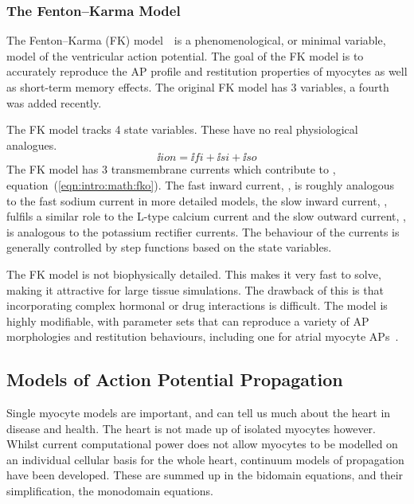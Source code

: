 \subsubsection{The Fenton--Karma Model}

The Fenton--Karma (FK) model~\cite{Fenton1998,Bueno-Orovio2008}\ is a
phenomenological, or minimal variable, model of the ventricular action
potential.
The goal of the FK model is to accurately reproduce the AP profile and
restitution properties of myocytes as well as short-term memory effects.
The original FK model has 3 variables, a fourth was added recently.

The FK model tracks 4 state variables.
These have no real physiological analogues.
\begin{equation}
\label{eqn:intro:math:fko}
\ii{ion} = \ii{fi} + \ii{si} + \ii{so}
\end{equation}
The FK model has 3 transmembrane currents which contribute to ,
equation~(\ref{eqn:intro:math:fko}).
The fast inward current, , is roughly analogous to the fast sodium
current in more detailed models, the slow inward current, , fulfils a
similar role to the L-type calcium current and the slow outward current, ,
is analogous to the potassium rectifier currents.
The behaviour of the currents is generally controlled by step functions based
on the state variables.

The FK model is not biophysically detailed.
This makes it very fast to solve, making it attractive for large tissue
simulations.
The drawback of this is that incorporating complex hormonal or drug interactions
is difficult.
The model is highly modifiable, with parameter sets that can reproduce a variety
of AP morphologies and restitution behaviours, including one for atrial myocyte
APs~\cite{Weber2008}.

\subsection{Models of Action Potential Propagation}

Single myocyte models are important, and can tell us much about the heart in
disease and health.
The heart is not made up of isolated myocytes however.
Whilst current computational power does not allow myocytes to be modelled on an
individual cellular basis for the whole heart, continuum models of propagation
have been developed.
These are summed up in the bidomain equations, and their simplification, the
monodomain equations.

